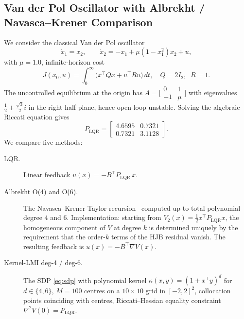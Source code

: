 \documentclass[11pt]{article}
\begin{document}
\subsection{Van der Pol Oscillator with Albrekht / Navasca--Krener Comparison}
\label{sec:vdp}
\label{sec:albrekht_comparison}

We consider the classical Van der Pol oscillator
\begin{equation}
\dot{x}_1 = x_2, \qquad
\dot{x}_2 = -x_1 + \mu (1 - x_1^2) x_2 + u,
\label{eq:vdp_dynamics}
\end{equation}
with $\mu = 1.0$, infinite-horizon cost
\begin{equation}
J(x_0, u) = \int_0^\infty \bigl( x^\top Q x + u^\top R u \bigr)\, dt,
\quad Q = 2I_2,\;\; R = 1.
\label{eq:vdp_cost}
\end{equation}
The uncontrolled equilibrium at the origin has $A = \bigl[\begin{smallmatrix}0&1\\-1&\mu\end{smallmatrix}\bigr]$ with eigenvalues $\tfrac12 \pm \tfrac{\sqrt{3}}{2}i$ in the right half plane, hence open-loop unstable. Solving the algebraic Riccati equation gives
\[
P_{\mathrm{LQR}} =
\begin{bmatrix}
4.6595 & 0.7321 \\
0.7321 & 3.1128
\end{bmatrix}.
\]
We compare five methods:
\begin{description}
\item[LQR.] Linear feedback $u(x) = -B^\top P_{\mathrm{LQR}}\,x$.
\item[Albrekht O(4) and O(6).] The Navasca--Krener Taylor recursion~\cite{albrekht_1961,navasca_krener_2000} computed up to total polynomial degree $4$ and $6$. Implementation: starting from $V_2(x) = \tfrac12 x^\top P_{\mathrm{LQR}} x$, the homogeneous component of $V$ at degree $k$ is determined uniquely by the requirement that the order-$k$ terms of the HJB residual vanish. The resulting feedback is $u(x) = -B^\top \nabla V(x)$.
\item[Kernel-LMI deg-4 / deg-6.] The SDP \eqref{eq:sdp} with polynomial kernel $\kappa(x,y) = (1 + x^\top y)^d$ for $d \in \{4, 6\}$, $M = 100$ centres on a $10 \times 10$ grid in $[-2, 2]^2$, collocation points coinciding with centres, Riccati--Hessian equality constraint $\nabla^2 V(0) = P_{\mathrm{LQR}}$.
\end{description}
\end{document}
